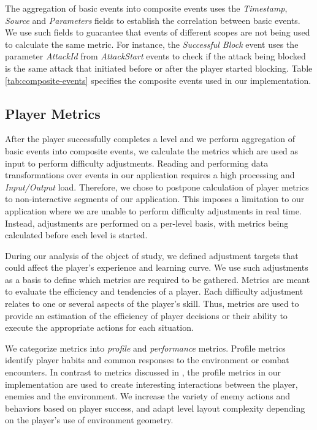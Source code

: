 The aggregation of basic events into composite events uses the \emph{Timestamp}, \emph{Source} and \emph{Parameters} fields to establish the correlation between basic events. We use such fields to guarantee that events of different scopes are not being used to calculate the same metric. For instance, the \emph{Successful Block} event uses the parameter \emph{AttackId} from \emph{AttackStart} events to check if the attack being blocked is the same attack that initiated before or after the player started blocking. Table \ref{tab:composite-events} specifies the composite events used in our implementation. 



\subsection{Player Metrics}

After the player successfully completes a level and we perform aggregation of basic events into composite events, we calculate the metrics which are used as input to perform difficulty adjustments. Reading and performing data transformations over events in our application requires a high processing and \emph{Input/Output} load. Therefore, we chose to postpone calculation of player metrics to  non-interactive segments of our application. This imposes a limitation to our application where we are unable to perform difficulty adjustments in real time. Instead, adjustments are performed on a per-level basis, with metrics being calculated before each level is started.

During our analysis of the object of study, we defined adjustment targets that could affect the player's experience and learning curve. We use such adjustments as a basis to define which metrics are required to be gathered. Metrics are meant to evaluate the efficiency and tendencies of a player. Each difficulty adjustment relates to one or several aspects of the player's skill. Thus, metrics are used to provide an estimation of the efficiency of player decisions or their ability to execute the appropriate actions for each situation.

We categorize metrics into \emph{profile} and \emph{performance} metrics. Profile metrics identify player habits and common responses to the environment or combat encounters. In contrast to metrics discussed in \citet{ARTICLE_DynamicPlayerModelling}, the profile metrics in our implementation are used to create interesting interactions between the player, enemies and the environment. We increase the variety of enemy actions and behaviors based on player success, and adapt level layout complexity depending on the player's use of environment geometry.

